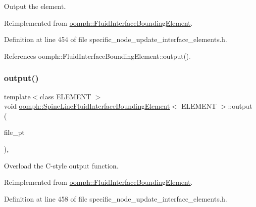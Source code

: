 Output the element. 



Reimplemented from \hyperlink{classoomph_1_1FluidInterfaceBoundingElement_af2c821d51d506221976a0c17e1615ac3}{oomph\+::\+Fluid\+Interface\+Bounding\+Element}.



Definition at line 454 of file specific\+\_\+node\+\_\+update\+\_\+interface\+\_\+elements.\+h.



References oomph\+::\+Fluid\+Interface\+Bounding\+Element\+::output().

\mbox{\label{classoomph_1_1SpineLineFluidInterfaceBoundingElement_ab34fbdcd7785ab6a731a3b5d50896829}} 
\subsubsection{\texorpdfstring{output()}{output()}\hspace{0.1cm}{\footnotesize\ttfamily [3/4]}}
{\footnotesize\ttfamily template$<$class E\+L\+E\+M\+E\+NT $>$ \\
void \hyperlink{classoomph_1_1SpineLineFluidInterfaceBoundingElement}{oomph\+::\+Spine\+Line\+Fluid\+Interface\+Bounding\+Element}$<$ E\+L\+E\+M\+E\+NT $>$\+::output (\begin{DoxyParamCaption}\item[{F\+I\+LE $\ast$}]{file\+\_\+pt }\end{DoxyParamCaption})\hspace{0.3cm}{\ttfamily [inline]}, {\ttfamily [virtual]}}



Overload the C-\/style output function. 



Reimplemented from \hyperlink{classoomph_1_1FluidInterfaceBoundingElement_a85cc62405429744e3e3585894315cb9e}{oomph\+::\+Fluid\+Interface\+Bounding\+Element}.



Definition at line 458 of file specific\+\_\+node\+\_\+update\+\_\+interface\+\_\+elements.\+h.



